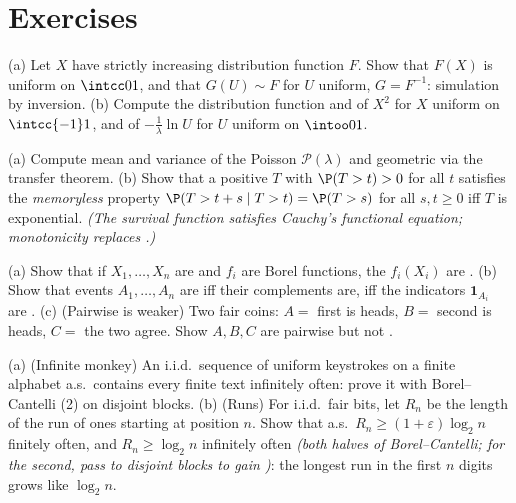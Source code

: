 \section{Exercises}

\begin{exercise}[$\star$]\label{exo:b3:probability:1}
(a) Let $X$ have  strictly increasing distribution
function $F$. Show that $F(X)$ is uniform on $\intcc01$, and
that $G(U) \sim F$ for $U$ uniform, $G = F^{-1}$: simulation
by inversion.
(b) Compute the distribution function and  of $X^2$
for $X$ uniform on $\intcc{-1}1$, and of $-\frac1\lambda\ln
U$ for $U$ uniform on $\intoo01$.
\end{exercise}

\begin{exercise}[$\star$]\label{exo:b3:probability:2}
(a) Compute mean and variance of the Poisson $\mathcal
P(\lambda)$ and geometric  via the transfer theorem.
(b) Show that a positive  $T$ with $\P(T > t)
> 0$ for all $t$ satisfies the \emph{memoryless} property $\P(T > t + s \mid
T > t) = \P(T > s)$ for all $s, t \geq 0$ iff $T$ is
exponential. \emph{(The survival function satisfies Cauchy's
functional equation; monotonicity replaces .)}
\end{exercise}

\begin{exercise}[$\star\star$]\label{exo:b3:probability:3}
(a) Show that if $X_1, \dots, X_n$ are  and $f_i$
are Borel functions, the $f_i(X_i)$ are .
(b) Show that events $A_1, \dots, A_n$ are  iff
their complements are, iff the indicators $\mathbf 1_{A_i}$
are  .
(c) (Pairwise is weaker) Two fair coins: $A = $ first is
heads, $B = $ second is heads, $C = $ the two agree. Show
$A, B, C$ are pairwise  but not .
\end{exercise}

\begin{exercise}[$\star\star$]\label{exo:b3:probability:4}
(a) (Infinite monkey) An i.i.d.\ sequence of uniform
keystrokes on a finite alphabet a.s.\ contains every finite
text infinitely often: prove it with Borel--Cantelli (2) on
disjoint blocks.
(b) (Runs) For i.i.d.\ fair bits, let $R_n$ be the length of
the run of ones starting at position $n$. Show that a.s.\
$R_n \geq (1+\varepsilon)\log_2n$ finitely often, and $R_n
\geq \log_2 n$ infinitely often \emph{(both halves of
Borel--Cantelli; for the second, pass to disjoint blocks to
gain )}: the longest run in the first $n$ digits
grows like $\log_2n$.
\end{exercise}

